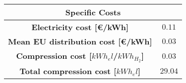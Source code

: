 \begin{table}[]
\begin{tabular}{cc}
\hline
\multicolumn{2}{c}{\cellcolor{bluepoli!40}\textbf{Specific Costs}} \\ \hline
\multicolumn{1}{|c|}{\cellcolor{bluepoli!40}\textbf{Electricity cost {[}€/kWh{]}}}          & \multicolumn{1}{c|}{\textbf{$0.11$}}  \\ \hline
\multicolumn{1}{|c|}{\cellcolor{bluepoli!40}\textbf{Mean EU distribution cost {[}€/kWh{]}}} & 
\multicolumn{1}{c|}{\textbf{$0.03 $}} \\ \hline
\multicolumn{1}{|c|}{\cellcolor{bluepoli!40}\textbf{Compression cost {[}$kWh_el$/$kWh_{H_2}${]}}}    & \multicolumn{1}{c|}{\textbf{$0.03$}}  \\ \hline
\multicolumn{1}{|c|}{\cellcolor{bluepoli!40}\textbf{Total compression cost {[}$kWh_el${]}}}      &
\multicolumn{1}{c|}{$29.04$}          \\ \hline
\end{tabular}
\end{table}